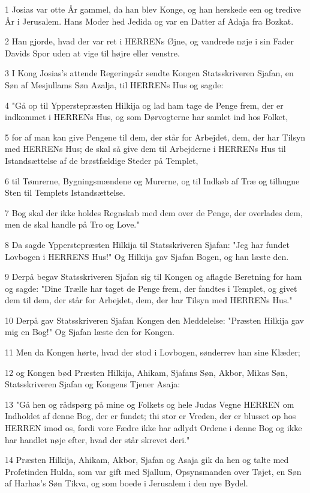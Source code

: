 \par 1 Josias var otte År gammel, da han blev Konge, og han herskede een og tredive År i Jerusalem. Hans Moder hed Jedida og var en Datter af Adaja fra Bozkat.
\par 2 Han gjorde, hvad der var ret i HERRENs Øjne, og vandrede nøje i sin Fader Davids Spor uden at vige til højre eller venstre.
\par 3 I Kong Josias's attende Regeringsår sendte Kongen Statsskriveren Sjafan, en Søn af Mesjullams Søn Azalja, til HERRENs Hus og sagde:
\par 4 "Gå op til Ypperstepræsten Hilkija og lad ham tage de Penge frem, der er indkommet i HERRENs Hus, og som Dørvogterne har samlet ind hos Folket,
\par 5 for af man kan give Pengene til dem, der står for Arbejdet, dem, der har Tilsyn med HERRENs Hus; de skal så give dem til Arbejderne i HERRENs Hus til Istandsættelse af de brøstfældige Steder på Templet,
\par 6 til Tømrerne, Bygningsmændene og Murerne, og til Indkøb af Træ og tilhugne Sten til Templets Istandsættelse.
\par 7 Bog skal der ikke holdes Regnskab med dem over de Penge, der overlades dem, men de skal handle på Tro og Love."
\par 8 Da sagde Ypperstepræsten Hilkija til Statsskriveren Sjafan: "Jeg har fundet Lovbogen i HERRENS Hus!" Og Hilkija gav Sjafan Bogen, og han læste den.
\par 9 Derpå begav Statsskriveren Sjafan sig til Kongen og aflagde Beretning for ham og sagde: "Dine Trælle har taget de Penge frem, der fandtes i Templet, og givet dem til dem, der står for Arbejdet, dem, der har Tilsyn med HERRENs Hus."
\par 10 Derpå gav Statsskriveren Sjafan Kongen den Meddelelse: "Præsten Hilkija gav mig en Bog!" Og Sjafan læste den for Kongen.
\par 11 Men da Kongen hørte, hvad der stod i Lovbogen, sønderrev han sine Klæder;
\par 12 og Kongen bød Præsten Hilkija, Ahikam, Sjafans Søn, Akbor, Mikas Søn, Statsskriveren Sjafan og Kongens Tjener Asaja:
\par 13 "Gå hen og rådspørg på mine og Folkets og hele Judas Vegne HERREN om Indholdet af denne Bog, der er fundet; thi stor er Vreden, der er blusset op hos HERREN imod os, fordi vore Fædre ikke har adlydt Ordene i denne Bog og ikke har handlet nøje efter, hvad der står skrevet deri."
\par 14 Præsten Hilkija, Ahikam, Akbor, Sjafan og Asaja gik da hen og talte med Profetinden Hulda, som var gift med Sjallum, Opsynsmanden over Tøjet, en Søn af Harhas's Søn Tikva, og som boede i Jerusalem i den nye Bydel.
